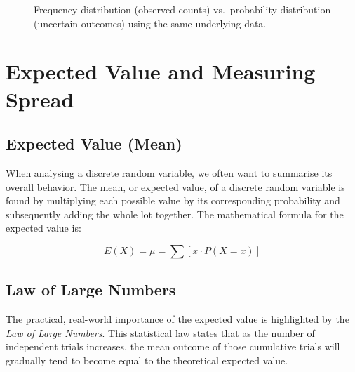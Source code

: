 \documentclass[12pt]{scrartcl}
\begin{document}
\begin{figure}[h]
\caption{Frequency distribution (observed counts) vs.\ probability distribution (uncertain outcomes) using the same underlying data.}
\end{figure}

\section{Expected Value and Measuring Spread}

\subsection{Expected Value (Mean)}

When analysing a discrete random variable, we often want to summarise its overall behavior. The mean, or expected value, of a discrete random variable is found by multiplying each possible value by its corresponding probability and subsequently adding the whole lot together. The mathematical formula for the expected value is:

\[
E(X) = \mu = \sum{[x  \cdot P(X=x)]}
\]

\subsection{Law of Large Numbers}
The practical, real-world importance of the expected value is highlighted by the \textit{Law of Large Numbers}. This statistical law states that as the number of independent trials increases, the mean outcome of those cumulative trials will gradually tend to become equal to the theoretical expected value.
\end{document}
